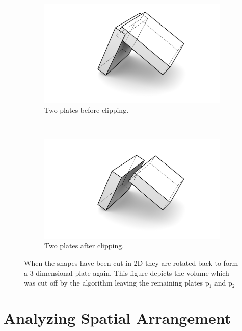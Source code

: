 \documentclass[../ClassicThesis.tex]{subfiles}
\begin{document}
\begin{figure}[ht]
    \centering
    \begin{subfigure}[b]{0.45\textwidth}
        \includegraphics[width=\columnwidth]{Images/BlocksIntersecting.png}
        \caption{Two plates before clipping.}
    \end{subfigure}
    ~
    \begin{subfigure}[b]{0.45\textwidth}
        \includegraphics[width=\columnwidth]{Images/BlocksIntersectingshortened.png}
        \caption{Two plates after clipping.}
    \end{subfigure}
    \caption{When the shapes have been cut in 2D they are rotated back to form a 3-dimensional plate again. This figure depicts the volume which was cut off by the algorithm leaving the remaining plates p$_1$ and p$_2$}
    \label{fig:3dPlaneClipping}
\end{figure}


\section{Analyzing Spatial Arrangement}
\end{document}
